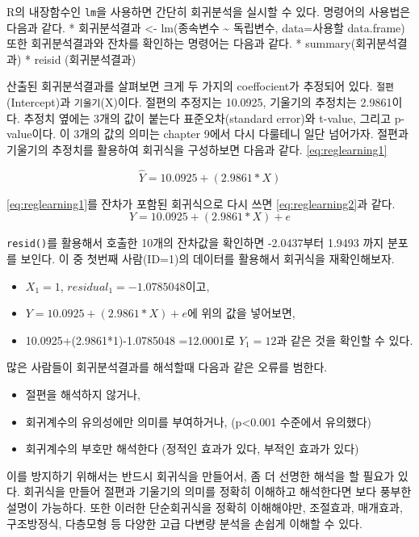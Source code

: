 \documentclass[
]{book}
\providecommand{\tightlist}{%
  \setlength{\itemsep}{0pt}\setlength{\parskip}{0pt}}
\begin{document}
R의 내장함수인 \texttt{lm}을 사용하면 간단히 회귀분석을 실시할 수 있다. 명령어의 사용법은 다음과 같다.
* 회귀분석결과 \textless- lm(종속변수 \textasciitilde{} 독립변수, data=사용할 data.frame)
또한 회귀분석결과와 잔차를 확인하는 명령어는 다음과 같다.
* summary(회귀분석결과)
* reisid (회귀분석결과)

산출된 회귀분석결과를 살펴보면 크게 두 가지의 coeffocient가 추정되어 있다. \texttt{절편}(Intercept)과 \texttt{기울기}(X)이다. 절편의 추정지는 10.0925, 기울기의 추정치는 2.9861이다. 추정치 옆에는 3개의 값이 붙는다 표준오차(standard error)와 t-value, 그리고 p-value이다. 이 3개의 값의 의미는 chapter 9에서 다시 다룰테니 일단 넘어가자.
절편과 기울기의 추정치를 활용하여 회귀식을 구성하보면 다음과 같다. \eqref{eq:reglearning1}

\begin{equation}
\hat{Y} = 10.0925+(2.9861*X)
\label{eq:reglearning1}
\end{equation}

\eqref{eq:reglearning1}를 잔차가 포함된 회귀식으로 다시 쓰면 \eqref{eq:reglearning2}과 같다.
\begin{equation}
Y = 10.0925+(2.9861*X) + e
\label{eq:reglearning2}
\end{equation}

\texttt{resid()}를 활용해서 호출한 10개의 잔차값을 확인하면 -2.0437부터 1.9493 까지 분포를 보인다. 이 중 첫번째 사람(ID=1)의 데이터를 활용해서 회귀식을 재확인해보자.

\begin{itemize}
\tightlist
\item
  \(X_1=1\), \(residual_1=-1.0785048\)이고,
\item
  \(Y = 10.0925+(2.9861*X) + e\)에 위의 값을 넣어보면,
\item
  10.0925+(2.9861*1)-1.0785048 =12.0001로 \(Y_1=12\)과 같은 것을 확인할 수 있다.
\end{itemize}

많은 사람들이 회귀분석결과를 해석할때 다음과 같은 오류를 범한다.

\begin{itemize}
\tightlist
\item
  절편을 해석하지 않거나,
\item
  회귀계수의 유의성에만 의미를 부여하거나, (p\textless0.001 수준에서 유의했다)
\item
  회귀계수의 부호만 해석한다 (정적인 효과가 있다, 부적인 효과가 있다)
\end{itemize}

이를 방지하기 위해서는 반드시 회귀식을 만들어서, 좀 더 선명한 해석을 할 필요가 있다. 회귀식을 만들어 절편과 기울기의 의미를 정확히 이해하고 해석한다면 보다 풍부한 설명이 가능하다. 또한 이러한 단순회귀식을 정확히 이해해야만, 조절효과, 매개효과, 구조방정식, 다층모형 등 다양한 고급 다변량 분석을 손쉽게 이해할 수 있다.
\end{document}
